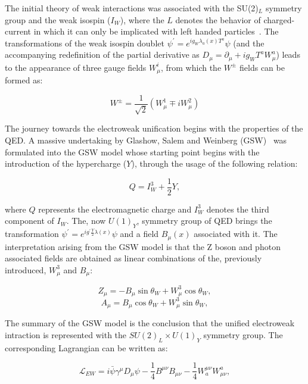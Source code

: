 \hspace{10pt} The initial theory of weak interactions was associated with the SU(2)$_L$ symmetry group and the weak isospin ($I_W$), where the $L$ denotes the behavior of charged-current in which it can only be implicated with left handed particles~\cite{thomson_2013, book:schwartz}. The transformations of the weak isospin doublet $\psi^{'} = e^{ig_W\lambda_a(x)T^a}\psi$ (and the accompanying redefinition of the partial derivative as $D_\mu = \partial_{\mu}+ig_WT^aW_\mu^a$) leads to the appearance of three gauge fields $W_\mu^i$, from which the $W^{\pm}$ fields can be formed as:

\begin{equation}
    W^{\pm} = \frac{1}{\sqrt{2}}(W_\mu^1\mp iW_\mu^2)
\end{equation}

\hspace{10pt} The journey towards the electroweak unification begins with the properties of the QED. A massive undertaking by Glashow, Salem and Weinberg (GSW)~\cite{glashow,salam,weinberg} was formulated into the GSW model whose starting point begins with the introduction of the hypercharge ($Y$), through the usage of the following relation:

\begin{equation}
    Q = I_W^3+\frac{1}{2}Y,
\end{equation}

where $Q$ represents the electromagnetic charge and $I_W^{3}$ denotes the third component of $I_W$. The, now $U(1)_Y$, symmetry group of QED brings the transformation $\psi^{'} = e^{ig^{'}\frac{Y}{2}\lambda(x)}\psi$ and a field $B_{\mu}(x)$ associated with it. The interpretation arising from the GSW model is that the Z boson and photon associated fields are obtained as linear combinations of the, previously introduced, $W^{3}_{\mu}$ and $B_{\mu}$:

\begin{equation}
    Z_{\mu} = -B_{\mu}\sin\theta_W + W^3_{\mu}\cos\theta_W,
\end{equation}  
\begin{equation}
    A_{\mu} = B_{\mu}\cos\theta_W + W^3_{\mu}\sin\theta_W,
\end{equation}

The summary of the GSW model is the conclusion that the unified electroweak intraction is represented with the $SU(2)_L\times U(1)_Y$ symmetry group. The corresponding Lagrangian can be written as:

\begin{equation}
    \mathcal{L}_{EW} = i\bar{\psi}\gamma^{\mu}D_{\mu}\psi - \frac{1}{4}B^{\mu\nu}B_{\mu\nu} - \frac{1}{4}W^{\mu\nu}_aW^a_{\mu\nu},
    \label{eq:ew_unification}
\end{equation}

